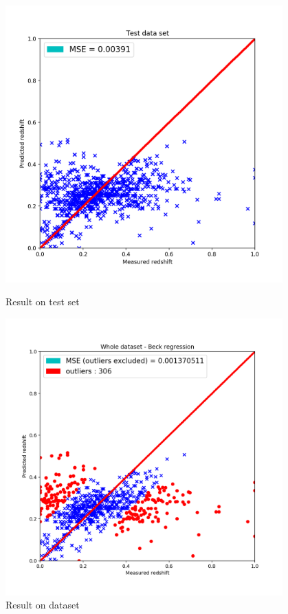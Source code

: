 \documentclass[a4paper,12pt]{article}
\begin{document}
\begin{figure}[H]
	\centering
	\begin{minipage}{0.5\textwidth}
		\centering
		\includegraphics[width=0.95\textwidth]{./dataframe.png}
		\caption{ Result on test set }
	\end{minipage}\hfill
	\begin{minipage}{0.5\textwidth}
		\centering
		\includegraphics[width=0.95\textwidth]{./dataframe-without-outliers.png}
		\caption{ Result on dataset }
	\end{minipage}
\end{figure}
\end{document}
